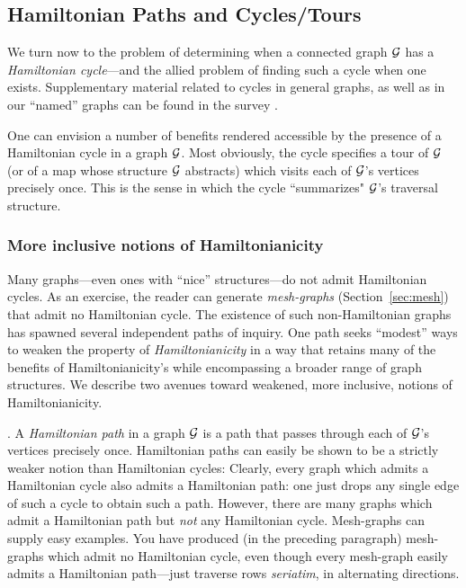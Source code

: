 
\subsection{Hamiltonian Paths and Cycles/Tours}
\label{sec:Hamiltonian-cycle}

We turn now to the problem of determining when a connected graph $\mbox{$\cal G$}$ has a {\it Hamiltonian cycle}---and the allied problem of finding such a cycle when one exists.  Supplementary material related to cycles in general graphs, as well as in our ``named'' graphs can be found in the survey \cite{Rosenberg91}.

\medskip

One can envision a number of benefits rendered accessible by the presence of a Hamiltonian cycle in a graph $\mbox{$\cal G$}$.  Most obviously, the cycle specifies a tour of $\mbox{$\cal G$}$ (or of a map whose structure $\mbox{$\cal G$}$ abstracts) which visits each of $\mbox{$\cal G$}$'s vertices precisely once.  This is the sense in which the cycle ``summarizes" $\mbox{$\cal G$}$'s traversal structure.

\subsubsection{More inclusive notions of Hamiltonianicity}


Many graphs---even ones with ``nice'' structures---do not admit Hamiltonian cycles.  As an exercise, the reader can generate {\it mesh-graphs} (Section~\ref{sec:mesh}) that admit no Hamiltonian cycle.  The existence of such non-Hamiltonian graphs has spawned several
independent paths of inquiry.  One path seeks ``modest'' ways to weaken the property of {\it Hamiltonianicity} in a way that retains many of the benefits of Hamiltonianicity's while encompassing a broader range of graph structures.  We describe two avenues toward weakened, more inclusive, notions of Hamiltonianicity.

\medskip

 

.
A {\it Hamiltonian path} in a graph $\mbox{$\cal G$}$ is a path that passes through each of $\mbox{$\cal G$}$'s vertices precisely once.  Hamiltonian paths can easily be shown to be a strictly weaker notion than Hamiltonian cycles:  Clearly, every graph which admits a Hamiltonian cycle also admits a Hamiltonian path: one just drops any single edge of such a cycle to obtain such a path.  However, there are many graphs which admit a Hamiltonian path but {\em not} any Hamiltonian cycle. Mesh-graphs can supply easy examples.  You have produced (in the preceding paragraph) mesh-graphs
which admit no Hamiltonian cycle, even though every mesh-graph easily admits a Hamiltonian path---just traverse rows {\it seriatim}, in alternating directions.

